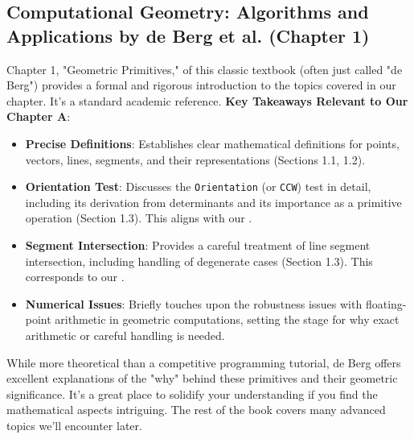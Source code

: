 \subsection{Computational Geometry: Algorithms and Applications by de Berg et al. (Chapter 1)}
\label{ssec:A.6.1}

\begin{furtherreading}
\label{fr:A.6.1.deberg}
Chapter 1, "Geometric Primitives," of this classic textbook (often just called "de Berg") provides a formal and rigorous introduction to the topics covered in our chapter. It's a standard academic reference.
\textbf{Key Takeaways Relevant to Our Chapter A}:
\begin{itemize}
    \item \textbf{Precise Definitions}: Establishes clear mathematical definitions for points, vectors, lines, segments, and their representations (Sections 1.1, 1.2).
    \item \textbf{Orientation Test}: Discusses the \texttt{Orientation} (or \texttt{CCW}) test in detail, including its derivation from determinants and its importance as a primitive operation (Section 1.3). This aligns with our .
    \item \textbf{Segment Intersection}: Provides a careful treatment of line segment intersection, including handling of degenerate cases (Section 1.3). This corresponds to our .
    \item \textbf{Numerical Issues}: Briefly touches upon the robustness issues with floating-point arithmetic in geometric computations, setting the stage for why exact arithmetic or careful handling is needed.
\end{itemize}
While more theoretical than a competitive programming tutorial, de Berg offers excellent explanations of the "why" behind these primitives and their geometric significance. It's a great place to solidify your understanding if you find the mathematical aspects intriguing. The rest of the book covers many advanced topics we'll encounter later.
\end{furtherreading}